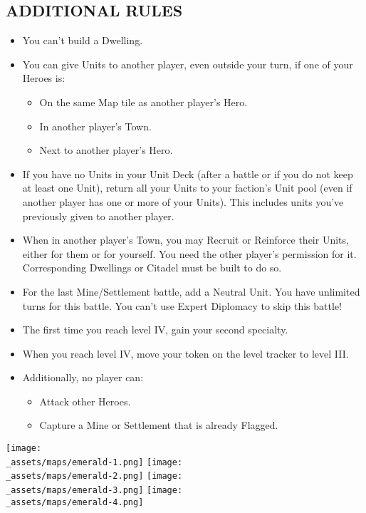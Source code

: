 \begin{multicols*}{2}
\subsection*{\MakeUppercase{Additional Rules}}
\begin{itemize}
    \item You can't build a  Dwelling.
    \item You can give Units to another player, even outside your turn, if one of your Heroes is:
    \begin{itemize}
        \item On the same Map tile as another player's Hero.
        \item In another player's Town.
        \item Next to another player's Hero.
    \end{itemize}
    \item If you have no Units in your Unit Deck (after a battle or if you do not keep at least one Unit), return all your Units to your faction's Unit pool (even if another player has one or more of your Units). This includes units you've previously given to another player.
    \item When in another player's Town, you may Recruit or Reinforce their Units, either for them or for yourself. You need the other player's permission for it. Corresponding Dwellings or Citadel must be built to do so.
    \item For the last Mine/Settlement battle, add a  Neutral Unit. You have unlimited turns for this battle. You can't use Expert Diplomacy to skip this battle!
    \item The first time you reach level IV, gain your second specialty.
    \item When you reach level IV, move your token on the level tracker to level III.
    \item Additionally, no player can:
    \begin{itemize}
        \item Attack other Heroes.
        \item Capture a Mine or Settlement that is already Flagged.
    \end{itemize}
\end{itemize}

\vspace{2em}

\begin{center}
  \texttt{[image: \\\_assets/maps/emerald-1.png]}
  \vspace{3em}
  \texttt{[image: \\\_assets/maps/emerald-2.png]}
  \vspace{3em}
  \texttt{[image: \\\_assets/maps/emerald-3.png]}
  \vspace{3em}
  \texttt{[image: \\\_assets/maps/emerald-4.png]}
\end{center}

\end{multicols*}
